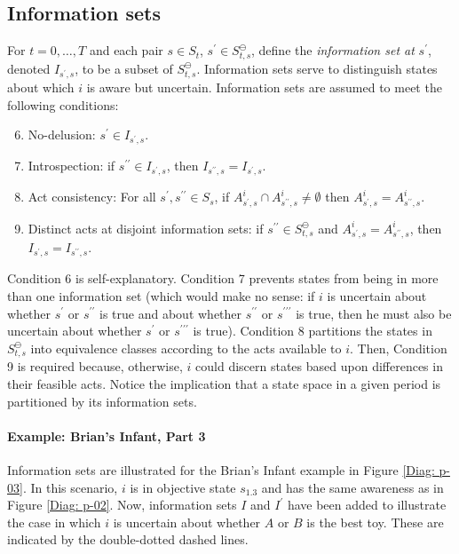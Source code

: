 \documentclass[
11pt,
titlepage,
reqno,
]{article}%
\theoremstyle{definition}
\begin{document}
\subsection{Information sets}
For $t=0,\ldots, T$ and each pair $s\in S_t$,  $s^\prime\in S^\ominus_{t,s}$, define the\textit{ information set at} $s^\prime$, denoted $I_{s^\prime,s}$,  to be a subset of $S^\ominus_{t,s}$.  
Information sets serve to distinguish states about which $i$ is aware but uncertain. Information sets are assumed to meet the following conditions:	
\begin{enumerate}
	\setcounter{enumi}{5}
	\item No-delusion: $s^\prime\in I_{s^\prime,s}$.
	\item Introspection: if $s^{\prime\prime}\in I_{s^\prime,s}$, then $I_{s^{\prime\prime},s}=I_{s^\prime,s}$.
	\item Act consistency: For all $s^\prime,s^{\prime\prime}\in S_s$, if $A^i_{s^\prime,s}\cap A^i_{s^{\prime\prime},s}\ne \emptyset$ then $A^i_{s^\prime,s}= A^i_{s^{\prime\prime},s}$.
	\item Distinct acts at disjoint information sets: if $s^{\prime\prime}\in S^\ominus_{t,s}$ and $A^i_{s^\prime,s}= A^i_{s^{\prime\prime},s}$, then $I_{s^\prime,s}=I_{s^{\prime\prime},s}$.
\end{enumerate}

Condition 6 is self-explanatory. 
Condition 7 prevents states from being in more than one information set (which would make no sense: if $i$ is uncertain about whether $s^{\prime}$ or $s^{\prime\prime}$ is true and about whether $s^{\prime\prime}$ or $s^{\prime\prime\prime}$ is true, then he must also be uncertain about whether $s^{\prime}$ or $s^{\prime\prime\prime}$ is true).
Condition 8  partitions the states in $S^\ominus_{t,s}$ into equivalence classes according to the acts available to $i$.
Then, Condition 9 is required because, otherwise, $i$ could discern states based upon differences in their feasible acts.
Notice the implication that a state space in a given period is partitioned by its information sets.
	
\paragraph{Example: Brian's Infant, Part 3}	Information sets are illustrated for the Brian's Infant example in Figure \ref{Diag: p-03}. 
In this scenario, $i$ is in objective state $s_{1.3}$ and has the same awareness as in Figure \ref{Diag: p-02}. 
Now, information sets $I$ and $I^\prime$ have been added to illustrate the case in which $i$ is uncertain about whether $A$ or $B$ is the best toy.
These are indicated by the double-dotted dashed lines. 
	
\end{document}
